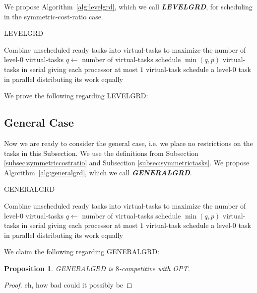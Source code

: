 \documentclass[twocolumn]{article}[10pt]
\newcommand{\defn}[1]{{\textit{\textbf{\boldmath #1}}}\xspace}
\newtheorem{proposition}{Proposition}
\begin{document}
We propose Algorithm~\ref{alg:levelgrd}, which we call \defn{LEVELGRD},
for scheduling in the symmetric-cost-ratio case.

\begin{algorithm}
  \caption{LEVELGRD}
  \label{alg:levelgrd}
  \begin{algorithmic}
        \State Combine unscheduled ready tasks into virtual-tasks
        to maximize the number of level-$0$ virtual-tasks
        \State $q \gets $ number of virtual-tasks 
          \State schedule $\min(q, p)$ virtual-tasks in serial
          \State giving each processor at most $1$ virtual-task
        \Else
          \State schedule a level-$0$ task in parallel
          \State distributing its work equally 
        \EndIf
      \EndIf
    \EndWhile
  \end{algorithmic}
\end{algorithm}

We prove the following regarding LEVELGRD:


\subsection{General Case}
Now we are ready to consider the general case, i.e. we place no
restrictions on the tasks in this Subsection.
We use the definitions from Subsection
\ref{subsec:symmetriccostratio} and Subsection
\ref{subsec:symmetrictasks}.
We propose Algorithm~\ref{alg:generalgrd}, which we call
\defn{GENERALGRD}.

\begin{algorithm}
  \caption{GENERALGRD}
  \label{alg:generalgrd}
  \begin{algorithmic}
        \State Combine unscheduled ready tasks into virtual-tasks
        to maximize the number of level-$0$ virtual-tasks
        \State $q \gets $ number of virtual-tasks 
          \State schedule $\min(q, p)$ virtual-tasks in serial
          \State giving each processor at most $1$ virtual-task
        \Else
          \State schedule a level-$0$ task in parallel
          \State distributing its work equally 
        \EndIf
      \EndIf
    \EndWhile
  \end{algorithmic}
\end{algorithm}

We claim the following regarding GENERALGRD:
\begin{proposition}
  GENERALGRD is $8$-competitive with OPT.
\end{proposition}
\begin{proof}
  eh, how bad could it possibly be
\end{proof}
\end{document}
